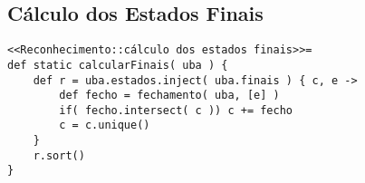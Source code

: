\subsection{Cálculo dos Estados Finais}

\begin{lstlisting}
<<Reconhecimento::cálculo dos estados finais>>=
def static calcularFinais( uba ) {
    def r = uba.estados.inject( uba.finais ) { c, e ->
        def fecho = fechamento( uba, [e] )
        if( fecho.intersect( c )) c += fecho
        c = c.unique()
    }
    r.sort()
}
\end{lstlisting}

